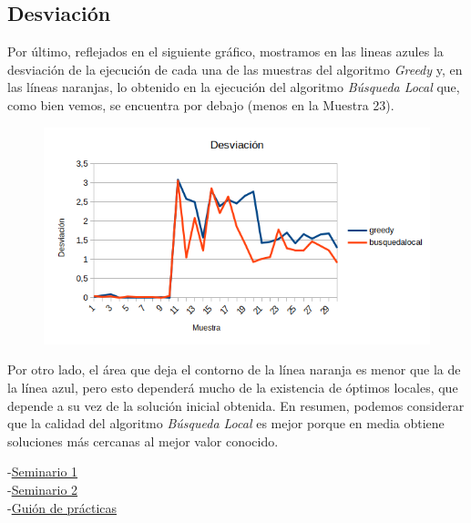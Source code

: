 \subsection{Desviación}
Por último, reflejados en el siguiente gráfico, mostramos en las lineas azules la desviación de la ejecución de cada una de las muestras del algoritmo \textit{Greedy} y, en las líneas naranjas, lo obtenido en la ejecución del algoritmo \textit{Búsqueda Local} que, como bien vemos, se encuentra por debajo (menos en la Muestra 23). 



\begin{figure}[H]
	\centering
	\includegraphics[scale=0.6]{img/desv.png}

\end{figure}

Por otro lado, el área que deja el contorno de la línea naranja es menor que la de la línea azul, pero esto dependerá mucho de la existencia de óptimos locales, que depende a su vez de la solución inicial obtenida. En resumen, podemos considerar que la calidad del algoritmo \textit{Búsqueda Local} es mejor porque en media obtiene soluciones más cercanas al mejor valor conocido.









\newpage





\begin{thebibliography}{X} 
	
-\href{https://sci2s.ugr.es/sites/default/files/files/Teaching/GraduatesCourses/Metaheuristicas/Sem01-Problemas-MHs-2019-20.pdf}{Seminario 1}\\
	
	-\href{https://sci2s.ugr.es/sites/default/files/files/Teaching/GraduatesCourses/Metaheuristicas/Sem02-Problemas-BusquedaLocal-MHs-19-20.pdf}{Seminario 2}\\
	
	-\href{https://sci2s.ugr.es/sites/default/files/files/Teaching/GraduatesCourses/Metaheuristicas/Guion\%20P1a\%20LocalGreedy\%20MDP\%20MHs\%202019-20.pdf}{Guión de prácticas}


\end{thebibliography}




